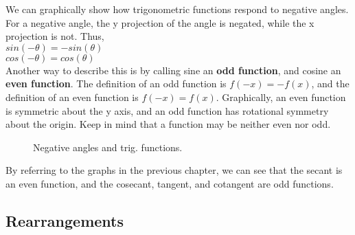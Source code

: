 We can graphically show how trigonometric functions respond to negative angles.  For a negative angle, the y projection of the angle is negated, while the x projection is not.  Thus,\\

\tab$sin(-\theta) = - sin(\theta)$\\

\tab$cos(-\theta) = cos(\theta)$\\

Another way to describe this is by calling sine an {\bf odd function}, and cosine an {\bf even function}.  The definition of an odd function is $f(-x) = -f(x)$, and the definition of an even function is $f(-x)=f(x)$.  Graphically, an even function is symmetric about the y axis, and an odd function has rotational symmetry about the origin.  Keep in mind that a function may be neither even nor odd.\\

\begin{figure}[htb]
\center
\caption{Negative angles and trig. functions.}
\label{fig:negative angles and trig. functions}
\end{figure}

By referring to the graphs in the previous chapter, we can see that the secant is an even function, and the cosecant, tangent, and cotangent are odd functions.\\

\subsection{Rearrangements}


